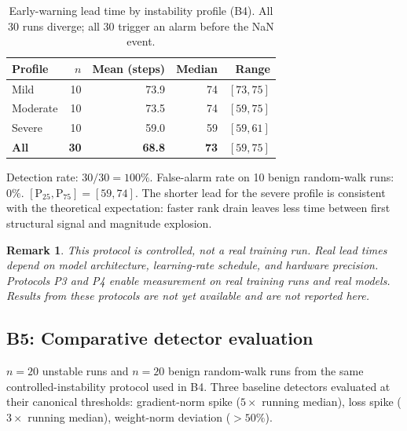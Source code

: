 \documentclass[11pt,a4paper]{article}
\theoremstyle{plain}
\newtheorem{remark}{Remark}
\begin{document}
\begin{table}[h]
\centering
\caption{Early-warning lead time by instability profile (B4).
  All 30 runs diverge; all 30 trigger an alarm before the NaN event.}
\label{tab:b4}
\begin{tabular}{lrrrr}
\toprule
Profile & $n$ & Mean (steps) & Median & Range \\
\midrule
Mild     & 10 & 73.9 & 74 & $[73, 75]$ \\
Moderate & 10 & 73.5 & 74 & $[59, 75]$ \\
Severe   & 10 & 59.0 & 59 & $[59, 61]$ \\
\midrule
\textbf{All} & \textbf{30} & \textbf{68.8} & \textbf{73} &
  \textbf{$[59, 75]$} \\
\bottomrule
\end{tabular}
\end{table}

Detection rate: $30/30 = 100\%$.
False-alarm rate on 10 benign random-walk runs: $0\%$.
$[\text{P}_{25}, \text{P}_{75}] = [59, 74]$.
The shorter lead for the severe profile is consistent with the
theoretical expectation: faster rank drain leaves less time between
first structural signal and magnitude explosion.

\begin{remark}
This protocol is controlled, not a real training run.
Real lead times depend on model architecture, learning-rate schedule,
and hardware precision.
Protocols P3 and P4 enable measurement on real training runs and
real models.
Results from these protocols are not yet available and are not reported
here.
\end{remark}

\subsection{B5: Comparative detector evaluation}
\label{sec:b5}

$n = 20$ unstable runs and $n = 20$ benign random-walk runs from the
same controlled-instability protocol used in B4.
Three baseline detectors evaluated at their canonical thresholds:
gradient-norm spike ($5\times$ running median),
loss spike ($3\times$ running median),
weight-norm deviation ($> 50\%$).
\end{document}
